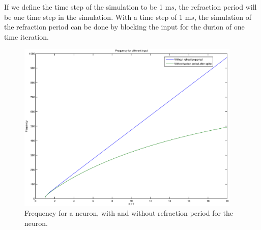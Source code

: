 If we define the time step of the simulation to be 1 m$s$, the refraction period will be one time step in the simulation.
With a time step of 1 m$s$, the simulation of the refraction period can be done by blocking the input for the durion of one time iteration.


\begin{figure}[bhtp]
	\begin{center}
		\includegraphics[width=0.95\textwidth]{frekvensPlotRefractionPeriod.eps}
	\end{center}
	\caption{Frequency for a neuron, with and without refraction period for the neuron.}
	\label{figFrekvensMedOgUtenRefractionPeriod}
\end{figure}



